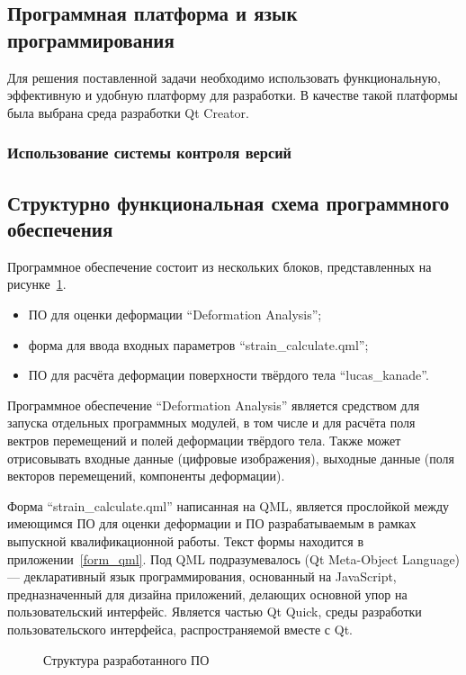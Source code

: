 \subsection {Программная платформа и язык программирования}
Для решения поставленной задачи необходимо использовать функциональную, эффективную и удобную платформу для разработки. В качестве такой платформы была выбрана среда разработки Qt Creator.

\subsubsection {Использование системы контроля версий}

\subsection{Структурно функциональная схема программного обеспечения}%

Программное обеспечение состоит из нескольких блоков, представленных на рисунке~\ref{pic:shema_PO}.

\begin{itemize}
\item ПО для оценки деформации ``Deformation Analysis'';
\item форма для ввода входных параметров ``strain\_calculate.qml'';
\item ПО для расчёта деформации поверхности твёрдого тела ``lucas\_kanade''.
\end{itemize}

Программное обеспечение ``Deformation Analysis'' является средством для запуска отдельных программных модулей, в том числе и для расчёта поля вектров перемещений и полей деформации твёрдого тела. Также может отрисовывать входные данные (цифровые изображения), выходные данные (поля векторов перемещений, компоненты деформации). 

Форма ``strain\_calculate.qml'' написанная на QML, является прослойкой между имеющимся ПО для оценки деформации и ПО разрабатываемым в рамках выпускной квалификационной работы. Текст формы находится в приложении~\ref{form_qml}. Под QML подразумевалось (Qt Meta-Object Language) — декларативный язык программирования, основанный на JavaScript, предназначенный для дизайна приложений, делающих основной упор на пользовательский интерфейс. Является частью Qt Quick, среды разработки пользовательского интерфейса, распространяемой вместе с Qt.

\begin{figure}[h!]
\caption{Структура разработанного ПО}
\label{pic:shema_PO}
\end{figure}

